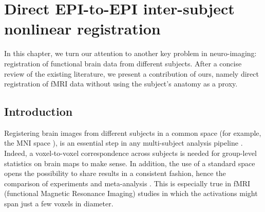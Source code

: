 \chapter{Direct EPI-to-EPI inter-subject nonlinear registration}\label{chap:epi2epi}

\minitoc

In this chapter, we turn our attention to another key problem in neuro-imaging: registration of functional brain data from different subjects. After a concise review of the existing literature,
we present a contribution of ours, namely direct registration of fMRI data without using the subject's anatomy as a proxy.

\section{Introduction}
Registering brain images from different subjects in a common space
(for example, the MNI space \citep{pmid8126267,pmid9343592}), is an
essential step in any multi-subject analysis pipeline \citep{FristonBook}. Indeed, a
voxel-to-voxel correspondence across subjects is needed for
group-level statistics on brain maps to make sense.
In addition, the use of a standard space opens the possibility to share
results in a consistent fashion, hence the comparison of experiments
and meta-analysis \citep{pmid18985131,pmid25914639}.
This is especially true in fMRI (functional Magnetic Resonance Imaging)
studies in which the activations might span just a few voxels in diameter.

